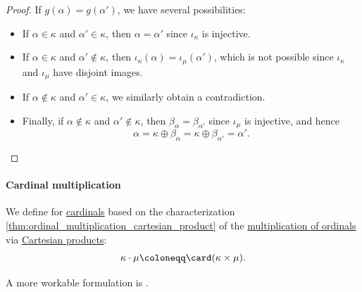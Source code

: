 \begin{proof}
   If \( g(\alpha) = g(\alpha') \), we have several possibilities:
  \begin{itemize}
    \item If \( \alpha \in \kappa \) and \( \alpha' \in \kappa \), then \( \alpha = \alpha' \) since \( \iota_\kappa \) is injective.
    \item If \( \alpha \in \kappa \) and \( \alpha' \not\in \kappa \), then \( \iota_\kappa(\alpha) = \iota_\mu(\alpha') \), which is not possible since \( \iota_\kappa \) and \( \iota_\mu \) have disjoint images.
    \item If \( \alpha \not\in \kappa \) and \( \alpha' \in \kappa \), we similarly obtain a contradiction.
    \item Finally, if \( \alpha \not\in \kappa \) and \( \alpha' \not\in \kappa \), then \( \beta_\alpha = \beta_{\alpha'} \) since \( \iota_\mu \) is injective, and hence
    \begin{equation*}
      \alpha = \kappa \oplus \beta_\alpha = \kappa \oplus \beta_{\alpha'} = \alpha'.
    \end{equation*}
  \end{itemize}

   
\end{proof}

\paragraph{Cardinal multiplication}

\begin{definition}\label{def:cardinal_multiplication}
  We define  for \hyperref[def:cardinal]{cardinals} based on the characterization \cref{thm:ordinal_multiplication_cartesian_product} of the \hyperref[def:multiplication_addition]{multiplication of ordinals} via \hyperref[def:cartesian_product]{Cartesian products}:
  \begin{equation*}
    \kappa \cdot \mu \coloneqq \card(\kappa \times \mu).
  \end{equation*}
\end{definition}
\begin{comments}
  \item A more workable formulation is .
\end{comments}

